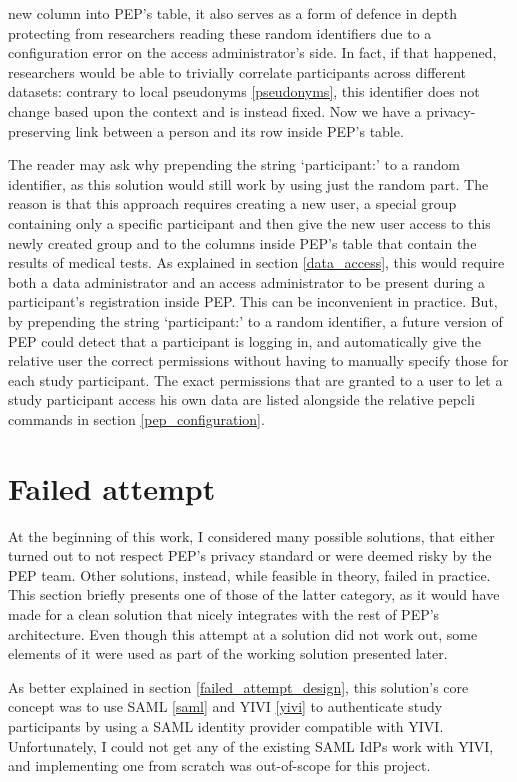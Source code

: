 \documentclass{report}
\begin{document}
new column into PEP's table, it also serves as a form of defence in depth protecting from researchers reading these random identifiers due to a configuration error on the access
administrator's side. In fact, if that happened, researchers would be able to trivially correlate participants across different datasets: contrary to local pseudonyms
\ref{pseudonyms}, this identifier does not change based upon the context and is instead fixed. Now we have a privacy-preserving link between a person and its row inside PEP's
table. \par
The reader may ask why prepending the string \enquote*{participant:} to a random identifier, as this solution would still work by using just the random part. The reason is that
this approach requires creating a new user, a special group containing only a specific participant and then give the new user access to this newly created group and to the columns
inside PEP's table that contain the results of medical tests. As explained in section \ref{data_access}, this would require both a data administrator and an access administrator to
be present during a participant's registration inside PEP. This can be inconvenient in practice. But, by prepending the string \enquote*{participant:} to a random identifier, a
future version of PEP
could detect that a participant is logging in, and automatically give the relative user the correct permissions without having to manually specify those for each study participant.
The exact permissions that are granted to a user to let a study participant access his own data are listed alongside the relative pepcli commands in section \ref{pep_configuration}.

\section{Failed attempt}
At the beginning of this work, I considered many possible solutions, that either turned out to not respect PEP's privacy standard or were deemed risky by the PEP team. Other
solutions, instead, while feasible in theory, failed in practice. This section briefly presents one of those of the latter category, as it would have made for a clean solution that
nicely integrates with the rest of PEP's architecture. Even though this attempt at a solution did not work out, some elements of it were used as part of the working solution
presented later.\par
As better explained in section \ref{failed_attempt_design}, this solution's core concept was to use SAML \ref{saml} and YIVI \ref{yivi} to authenticate study participants by using
a SAML identity provider compatible with YIVI. Unfortunately, I could not get any of the existing SAML IdPs work with YIVI, and implementing one from scratch was out-of-scope for this project.
\end{document}
